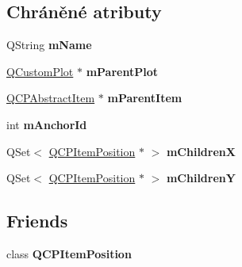 \subsection*{Chráněné atributy}
\begin{DoxyCompactItemize}
\item 
\hypertarget{classQCPItemAnchor_a23ad4d0ab0d2cbb41a7baf05bcf996ec}{}Q\+String {\bfseries m\+Name}\label{classQCPItemAnchor_a23ad4d0ab0d2cbb41a7baf05bcf996ec}

\item 
\hypertarget{classQCPItemAnchor_a59b968410831ba91a25cc75a77dde6f5}{}\hyperlink{classQCustomPlot}{Q\+Custom\+Plot} $\ast$ {\bfseries m\+Parent\+Plot}\label{classQCPItemAnchor_a59b968410831ba91a25cc75a77dde6f5}

\item 
\hypertarget{classQCPItemAnchor_a80fad480ad3bb980446ed6ebc00818ae}{}\hyperlink{classQCPAbstractItem}{Q\+C\+P\+Abstract\+Item} $\ast$ {\bfseries m\+Parent\+Item}\label{classQCPItemAnchor_a80fad480ad3bb980446ed6ebc00818ae}

\item 
\hypertarget{classQCPItemAnchor_a00c62070333e8345976b579676ad3997}{}int {\bfseries m\+Anchor\+Id}\label{classQCPItemAnchor_a00c62070333e8345976b579676ad3997}

\item 
\hypertarget{classQCPItemAnchor_a3c0bfd6e50f3b48e2a9b3824695b20f7}{}Q\+Set$<$ \hyperlink{classQCPItemPosition}{Q\+C\+P\+Item\+Position} $\ast$ $>$ {\bfseries m\+Children\+X}\label{classQCPItemAnchor_a3c0bfd6e50f3b48e2a9b3824695b20f7}

\item 
\hypertarget{classQCPItemAnchor_a3abe4eebd0683454d81c8341df6f7115}{}Q\+Set$<$ \hyperlink{classQCPItemPosition}{Q\+C\+P\+Item\+Position} $\ast$ $>$ {\bfseries m\+Children\+Y}\label{classQCPItemAnchor_a3abe4eebd0683454d81c8341df6f7115}

\end{DoxyCompactItemize}
\subsection*{Friends}
\begin{DoxyCompactItemize}
\item 
\hypertarget{classQCPItemAnchor_aa9b8ddc062778e202a0be06a57d18d17}{}class {\bfseries Q\+C\+P\+Item\+Position}\label{classQCPItemAnchor_aa9b8ddc062778e202a0be06a57d18d17}

\end{DoxyCompactItemize}


